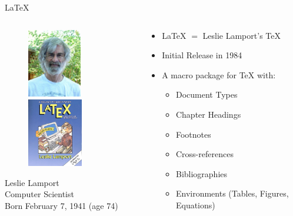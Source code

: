 \documentclass{beamer}
\begin{document}
\begin{frame}{\LaTeX{}}
\begin{columns}
\begin{column}{4cm}
\begin{figure}
   \includegraphics[height=3cm]{leslie.jpg}
   \includegraphics[height=3cm]{latex.jpg}
\end{figure}
\begin{center}
\tiny
Leslie Lamport \\
Computer Scientist \\
Born February 7, 1941 (age 74) \\
\end{center}
\end{column}
\begin{column}{6cm}
\begin{itemize}
\item \LaTeX{} $=$ Leslie Lamport's \TeX{}
\pause
\item Initial Release in 1984
\pause
\item A macro package for \TeX{} with:
\begin{itemize}
\item Document Types
\item Chapter Headings
\item Footnotes
\item Cross-references
\item Bibliographies
\item Environments (Tables, Figures, Equations)
\end{itemize}
\end{itemize}
\end{column}
\end{columns}
\end{frame}

\end{document}
